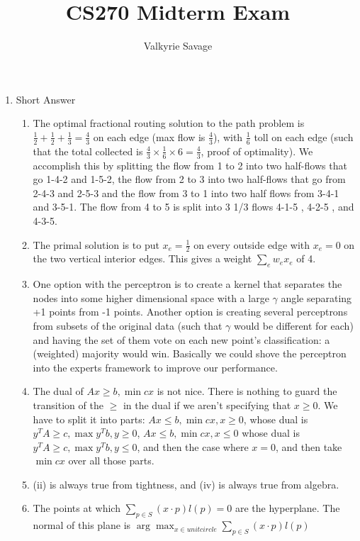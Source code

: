 \documentclass[a4paper]{article}
\title{CS270 Midterm Exam}
\author{Valkyrie Savage}
\begin{document}
\maketitle

\begin{enumerate}
\item Short Answer
	\begin{enumerate}
		\item The optimal fractional routing solution to the path problem is $\frac{1}{2} + \frac{1}{2} + \frac{1}{3} = \frac{4}{3}$ on each edge (max flow is $\frac{4}{3}$), with  $\frac{1}{6}$ toll on each edge (such that the total collected is $\frac{4}{3} \times \frac{1}{6} \times 6 = \frac{4}{3}$, proof of optimality).  We accomplish this by splitting the flow from 1 to 2 into two half-flows that go 1-4-2 and 1-5-2, the flow from 2 to 3 into two half-flows that go from 2-4-3 and 2-5-3 and the flow from 3 to 1 into two half flows from 3-4-1 and 3-5-1.  The flow from 4 to 5 is split into 3 1/3 flows  4-1-5 , 4-2-5 , and 4-3-5.
		\item The primal solution is to put $x_e = \frac{1}{2}$ on every outside edge with $x_e = 0$ on the two vertical interior edges.  This gives a weight $\sum_e w_e x_e$ of 4.
		\item One option with the perceptron is to create a kernel that separates the nodes into some higher dimensional space with a large $\gamma$ angle separating +1 points from -1 points.  Another option is creating several perceptrons from subsets of the original data (such that $\gamma$ would be different for each) and having the set of them vote on each new point's classification: a (weighted) majority would win.  Basically we could shove the perceptron into the experts framework to improve our performance.
		\item The dual of $Ax \geq b, \min cx$ is not nice.  There is nothing to guard the transition of the $\geq$ in the dual if we aren't specifying that $x \geq 0$.  We have to split it into parts: $Ax \leq b, \min cx, x \geq 0$, whose dual is $y^TA \geq c, \max y^Tb, y\geq 0$, $Ax \leq b, \min cx, x \leq 0$ whose dual is $y^TA \geq c, \max y^Tb, y\leq 0$, and then the case where $x=0$, and then take $\min cx$ over all those parts.
		\item (ii) is always true from tightness, and (iv) is always true from algebra.
		\item The points at which $\sum_{p \in S} (x \cdot p)l(p) = 0$ are the hyperplane.  The normal of this plane is $\arg\!\max_{x \in unit circle} \sum_{p \in S} (x \cdot p)l(p)$

\end{enumerate}
\end{enumerate}
\end{document}
